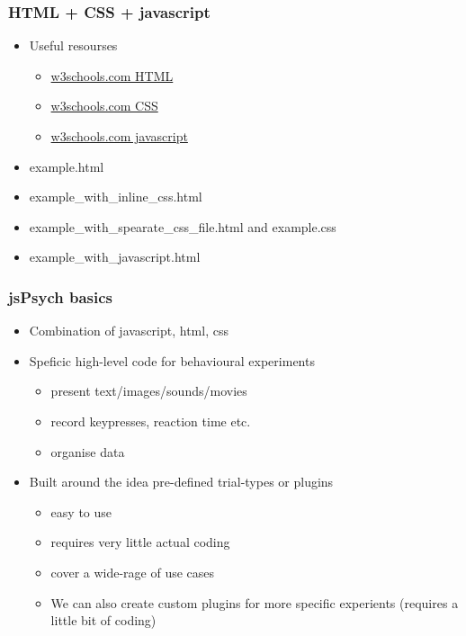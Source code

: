 \documentclass[t]{beamer}
\begin{document}
\begin{frame}[fragile]
    \frametitle{HTML + CSS + javascript}
    \begin{itemize}
        \item Useful resourses
            \begin{itemize}
                \item \href{https://www.w3schools.com/html/default.asp}{w3schools.com HTML}
                \item \href{https://www.w3schools.com/css/default.asp}{w3schools.com CSS}
                \item \href{https://www.w3schools.com/js/DEFAULT.asp}{w3schools.com javascript}
            \end{itemize}
        \item example.html
        \item example_with_inline_css.html
        \item example_with_spearate_css_file.html and example.css
        \item example_with_javascript.html
    \end{itemize}
\end{frame}


\begin{frame}[fragile]
    \frametitle{jsPsych basics}
    \begin{itemize}
        \item Combination of javascript, html, css
        \item Speficic high-level code for behavioural experiments 
            \begin{itemize}
                \item present text/images/sounds/movies
                \item record keypresses, reaction time etc.
                \item organise data 
            \end{itemize}
        \item Built around the idea pre-defined trial-types or plugins
            \begin{itemize}
                \item easy to use 
                \item requires very little actual coding
                \item cover a wide-rage of use cases 
                \item We can also create custom plugins for more specific experients (requires a little bit of coding)
            \end{itemize}
    \end{itemize}
\end{frame}



\end{document}
